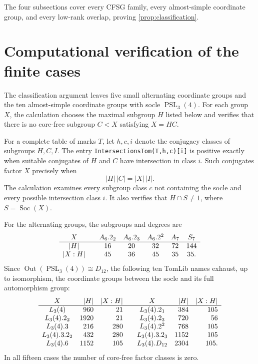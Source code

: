 \documentclass[11pt]{amsart}
\newcommand{\Soc}{\operatorname{Soc}}
\newcommand{\Out}{\operatorname{Out}}
\newcommand{\PSL}{\operatorname{PSL}}
\theoremstyle{definition}
\begin{document}
The four subsections cover every CFSG family, every almost-simple coordinate
group, and every low-rank overlap, proving \cref{prop:classification}.

\section{Computational verification of the finite cases}\label{app:computer}

The classification argument leaves five small alternating coordinate groups
and the ten almost-simple coordinate groups with socle \(\PSL_3(4)\).  For
each group \(X\), the calculation chooses the maximal subgroup \(H\) listed
below and verifies that there is no core-free subgroup \(C<X\) satisfying
\(X=HC\).

For a complete table of marks \(T\), let \(h,c,i\) denote the conjugacy
classes of subgroups \(H,C,I\).  The entry
\texttt{IntersectionsTom(T,h,c)[i]} is positive exactly when suitable
conjugates of \(H\) and \(C\) have intersection in class \(i\).  Such
conjugates factor \(X\) precisely when
\[
 \lvert H\rvert\,\lvert C\rvert
   =\lvert X\rvert\,\lvert I\rvert.
\]
The calculation examines every subgroup class \(c\) not containing the
socle and every possible intersection class \(i\).  It also verifies that
\(H\cap S\ne1\), where \(S=\Soc(X)\).

For the alternating groups, the subgroups and degrees are
\[
\begin{array}{c@{\qquad}ccccc}
X&A_6.2_2&A_6.2_3&A_6.2^2&A_7&S_7\\ \hline
\lvert H\rvert&16&20&32&72&144\\
\lvert X:H\rvert&45&36&45&35&35.
\end{array}
\]
Since \(\Out(\PSL_3(4))\cong D_{12}\), the following ten TomLib names
exhaust, up to isomorphism, the coordinate groups between the socle and its
full automorphism group:
\[
\begin{array}{crr@{\qquad}crr}
X&\lvert H\rvert&\lvert X:H\rvert&X&\lvert H\rvert&\lvert X:H\rvert\\ \hline
L_3(4)&960&21&L_3(4).2_1&384&105\\
L_3(4).2_2&1920&21&L_3(4).2_3&720&56\\
L_3(4).3&216&280&L_3(4).2^2&768&105\\
L_3(4).3.2_2&432&280&L_3(4).3.2_3&1152&105\\
L_3(4).6&1152&105&L_3(4).D_{12}&2304&105.
\end{array}
\]
In all fifteen cases the number of core-free factor classes is zero.
\end{document}
